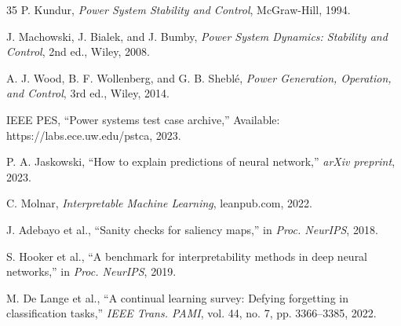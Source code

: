 \documentclass[journal,12pt,onecolumn]{IEEEtran}
\begin{document}
\begin{thebibliography}{35}
P. Kundur, \emph{Power System Stability and Control}, McGraw-Hill, 1994.

J. Machowski, J. Bialek, and J. Bumby, \emph{Power System Dynamics: Stability and Control}, 2nd ed., Wiley, 2008.

A. J. Wood, B. F. Wollenberg, and G. B. Sheblé, \emph{Power Generation, Operation, and Control}, 3rd ed., Wiley, 2014.

IEEE PES, ``Power systems test case archive,'' Available: https://labs.ece.uw.edu/pstca, 2023.

P. A. Jaskowski, ``How to explain predictions of neural network,'' \emph{arXiv preprint}, 2023.

C. Molnar, \emph{Interpretable Machine Learning}, leanpub.com, 2022.

J. Adebayo et al., ``Sanity checks for saliency maps,'' in \emph{Proc. NeurIPS}, 2018.

S. Hooker et al., ``A benchmark for interpretability methods in deep neural networks,'' in \emph{Proc. NeurIPS}, 2019.

M. De Lange et al., ``A continual learning survey: Defying forgetting in classification tasks,'' \emph{IEEE Trans. PAMI}, vol. 44, no. 7, pp. 3366--3385, 2022.

\end{thebibliography}
\end{document}
